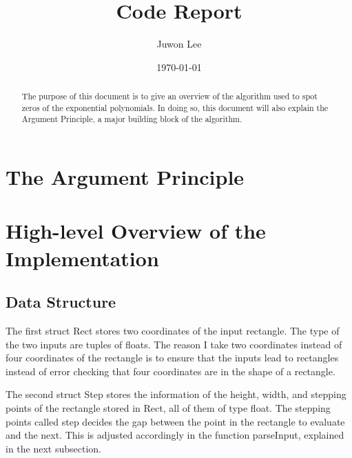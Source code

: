 \documentclass[11pt,reqno,oneside,a4paper]{article}
\author{Juwon Lee}
\title{Code Report}
\date{\today}
\begin{document}
\maketitle
\thispagestyle{fancy}

\begin{abstract}
	The purpose of this document is to give an overview of the algorithm used to spot zeros of the exponential polynomials.
	In doing so, this document will also explain the Argument Principle, a major building block of the algorithm.
\end{abstract}

\section{The Argument Principle}
	


\section{High-level Overview of the Implementation}
\subsection{Data Structure}
	The first struct Rect stores two coordinates of the input rectangle. 
	The type of the two inputs are tuples of floats.
	The reason I take two coordinates instead of four coordinates of the rectangle is to ensure that the inputs lead to rectangles instead of error checking that four coordinates are in the shape of a rectangle. 
	
	The second struct Step stores the information of the height, width, and stepping points of the rectangle stored in Rect, all of them of type float.
	The stepping points called step decides the gap between the point in the rectangle to evaluate and the next. 
	This is adjusted accordingly in the function parseInput, explained in the next subsection. 
	
\end{document}

